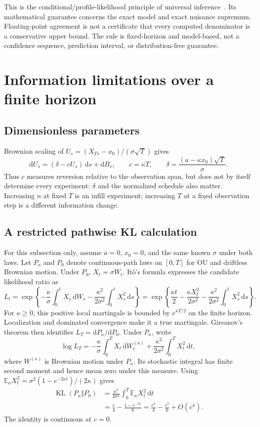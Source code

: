 \documentclass[11pt]{article}
\newcommand{\E}{\mathbb E}
\newcommand{\KL}{\operatorname{KL}}
\newcommand{\D}{\mathrm d}
\begin{document}
This is the conditional/profile-likelihood principle of universal
inference~\cite{universal}. Its mathematical guarantee concerns the exact model
and exact nuisance supremum. Floating-point agreement is not a certificate that
every computed denominator is a conservative upper bound. The rule is
fixed-horizon and model-based, not a confidence sequence, prediction interval,
or distribution-free guarantee.

\section{Information limitations over a finite horizon}
\subsection{Dimensionless parameters}
Brownian scaling of $U_s=(X_{Ts}-x_0)/(\sigma\sqrt T)$ gives
\[
 \D U_s=(\delta-cU_s)\,\D s+\D B_s,
 \qquad c=\kappa T,\qquad
 \delta=\frac{(a-\kappa x_0)\sqrt T}{\sigma}.
\]
Thus $c$ measures reversion relative to the observation span, but does not
by itself determine every experiment: $\delta$ and the normalized schedule
also matter. Increasing $n$ at fixed $T$ is an infill experiment; increasing
$T$ at a fixed observation step is a different information change.

\subsection{A restricted pathwise KL calculation}
For this subsection only, assume $a=0$, $x_0=0$, and the same known $\sigma$
under both laws. Let $P_\kappa$ and $P_0$ denote continuous-path laws on $[0,T]$
for OU and driftless Brownian motion. Under $P_0$, $X_t=\sigma W_t$. It\^o's
formula expresses the candidate likelihood ratio as
\[
 L_t=\exp\left\{-\frac\kappa\sigma\int_0^tX_s\,\D W_s
 -\frac{\kappa^2}{2\sigma^2}\int_0^tX_s^2\,\D s\right\}
 =\exp\left\{\frac{\kappa t}{2}-\frac{\kappa X_t^2}{2\sigma^2}
 -\frac{\kappa^2}{2\sigma^2}\int_0^tX_s^2\,\D s\right\}.
\]
For $\kappa\geq0$, this positive local martingale is bounded by
$e^{\kappa T/2}$ on the finite horizon. Localization and dominated convergence
make it a true martingale. Girsanov's theorem then identifies
$L_T=\D P_\kappa/\D P_0$. Under $P_\kappa$, write
\[
 \log L_T=-\frac\kappa\sigma\int_0^T X_t\,\D W_t^{(\kappa)}
 +\frac{\kappa^2}{2\sigma^2}\int_0^T X_t^2\,\D t,
\]
where $W^{(\kappa)}$ is Brownian motion under $P_\kappa$. Its stochastic
integral has finite second moment and hence mean zero under this measure. Using
$\E_\kappa X_t^2=\sigma^2(1-e^{-2\kappa t})/(2\kappa)$ gives
\begin{align}
 \KL(P_\kappa\Vert P_0)
 &=\frac{\kappa^2}{2\sigma^2}\int_0^T\E_\kappa X_t^2\,\D t\\
 &=\frac c4-\frac{1-e^{-2c}}8
 =\frac{c^2}{4}-\frac{c^3}{6}+O(c^4).
 \label{eq:kl}
\end{align}
The identity is continuous at $c=0$.
\end{document}
